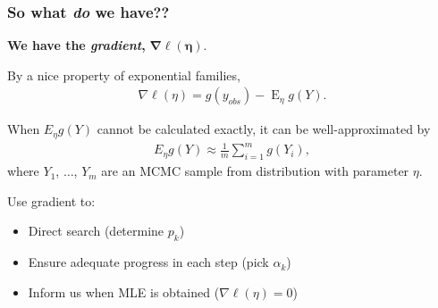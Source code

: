 \documentclass[ 10pt]{beamer}
\DeclareMathOperator{\E}{E}
\begin{document}
\frame
{
\frametitle{So what \emph{do} we have??}

{\textbf{We have the \emph{gradient},} $\boldsymbol{\nabla \ell(\eta)}$.}
\vspace*{2mm}

By a nice property of exponential families,
\begin{align*}
	\nabla \ell( \eta ) = g(y_{obs}) - \E_{\eta} g(Y).
\end{align*}

\pause
When $E_\eta g(Y)$ cannot be calculated exactly, it can be well-approximated by
\begin{align*}
E_\eta g(Y) \approx \frac{1}{m}\sum_{i = 1}^m g(Y_i),
\end{align*}
where $Y_1$, $\ldots$, $Y_m$ are an MCMC sample from distribution with parameter $\eta$.
\vspace*{4mm}

\pause
Use gradient to: 
\vspace*{2mm}
\begin{itemize}
\item Direct search  (determine $p_k$)
\vspace*{2mm}

\item Ensure adequate progress  in each step  (pick $\alpha_k$)
\vspace*{2mm}

\item Inform us when MLE is obtained  ($\nabla \ell(\eta) = 0$)
\end{itemize}

}

%
%
%
\end{document}
